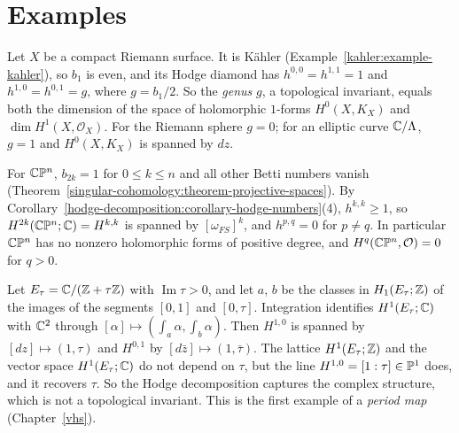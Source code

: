 \section{Examples}\label{hodge-decomposition:section-examples}

\begin{example}\label{hodge-decomposition:example-curves}
Let $X$ be a compact Riemann surface. It is K\"ahler (Example~\ref{kahler:example-kahler}), so $b_1$ is even, and its Hodge diamond has $h^{0,0} = h^{1,1} = 1$ and
$h^{1,0} = h^{0,1} = g$, where $g = b_1/2$. So the \emph{genus} $g$, a topological invariant, equals both the dimension of the space of
holomorphic $1$-forms $H^0(X, K_X)$ and $\dim H^1(X, \mathcal{O}_X)$. For the Riemann sphere $g = 0$; for an elliptic curve
$\mathbb{C}/\Lambda$, $g = 1$ and $H^0(X, K_X)$ is spanned by $dz$.
\end{example}

\begin{example}\label{hodge-decomposition:example-projective-space}
For $\mathbb{C}\mathbb{P}^n$, $b_{2k} = 1$ for $0 \leq k \leq n$ and all other Betti numbers vanish
(Theorem~\ref{singular-cohomology:theorem-projective-spaces}). By Corollary~\ref{hodge-decomposition:corollary-hodge-numbers}(4),
$h^{k,k} \geq 1$, so $H^{2k}(\mathbb{C}\mathbb{P}^n; \mathbb{C}) = H^{k,k}$ is spanned by $[\omega_{FS}]^k$, and $h^{p,q} = 0$ for $p \neq q$. In particular
$\mathbb{C}\mathbb{P}^n$ has no nonzero holomorphic forms of positive degree, and $H^q(\mathbb{C}\mathbb{P}^n, \mathcal{O}) = 0$ for $q > 0$.
\end{example}

\begin{example}\label{hodge-decomposition:example-elliptic-periods}
Let $E_\tau = \mathbb{C}/(\mathbb{Z} + \tau\mathbb{Z})$ with $\operatorname{Im}\tau > 0$, and let $a$, $b$ be the classes in $H_1(E_\tau; \mathbb{Z})$ of the images of
the segments $[0, 1]$ and $[0, \tau]$. Integration identifies $H^1(E_\tau; \mathbb{C})$ with $\mathbb{C}^2$ through
$[\alpha] \mapsto (\int_a\alpha, \int_b\alpha)$. Then $H^{1,0}$ is spanned by $[dz] \mapsto (1, \tau)$ and $H^{0,1}$ by
$[d\bar z] \mapsto (1, \bar\tau)$. The lattice $H^1(E_\tau; \mathbb{Z})$ and the vector space $H^1(E_\tau; \mathbb{C})$ do not depend on $\tau$, but the
line $H^{1,0} = [1 : \tau] \in \mathbb{P}^1$ does, and it recovers $\tau$. So the Hodge decomposition captures the complex structure, which is not a
topological invariant. This is the first example of a \emph{period map} (Chapter~\ref{vhs}).
\end{example}


